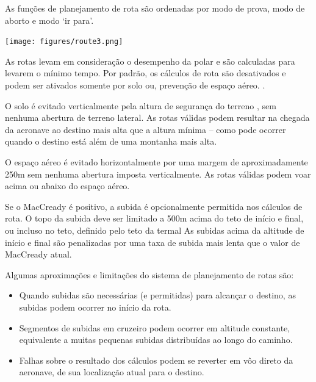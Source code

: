 As funções de planejamento de rota são ordenadas por modo de prova, modo de aborto e modo ‘ir para’.

\begin{center}
\texttt{[image: figures/route3.png]}
\end{center}

As rotas levam em consideração o desempenho da polar e são calculadas para levarem o mínimo 
tempo.  Por padrão, os cálculos de rota são desativados e podem ser ativados somente por 
solo ou, prevenção de espaço aéreo. .

O solo é evitado verticalmente pela altura de segurança do terreno
, sem nenhuma abertura de terreno lateral.  As rotas válidas podem 
resultar na chegada da aeronave ao destino mais alta que a altura mínima – como pode 
ocorrer quando o destino está além de uma montanha mais alta.

O espaço aéreo é evitado horizontalmente por uma margem de aproximadamente 250m sem 
nenhuma abertura imposta verticalmente.  As rotas válidas podem voar acima ou abaixo 
do espaço aéreo.

Se o MacCready é positivo, a subida é opcionalmente permitida nos cálculos de rota.  O 
topo da subida deve ser limitado a 500m acima do teto de início e final, ou incluso no 
teto, definido pelo teto da termal %
As subidas acima da altitude 
de início e final são penalizadas por uma taxa de subida mais lenta que o valor de 
MacCready atual.

Algumas aproximações e limitações do sistema de planejamento de rotas são:
\begin{itemize}
\item Quando subidas são necessárias (e permitidas) para alcançar o destino, as subidas podem ocorrer no início da rota. 
\item Segmentos de subidas em cruzeiro podem ocorrer em altitude constante, equivalente a muitas pequenas subidas distribuídas ao longo do caminho. 
\item Falhas sobre o resultado dos cálculos podem se reverter em vôo direto da aeronave, de sua localização atual para o destino.
\end{itemize}

